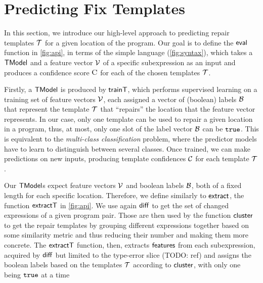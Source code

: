 \section{Predicting Fix Templates}
\label{sec:templ-pred}

In this section, we introduce our high-level approach to predicting repair
templates $\mathcal{T}$ for a given location of the program. Our goal is to define the
$\mathsf{eval}$ function in \autoref{fig:api}, in terms of the simple language
\repairLang (\autoref{fig:syntax}), which takes a $\mathsf{TModel}$ and a feature vector
$\mathcal{V}$ of a specific subexpression as an input and produces a confidence score
$\textsc{C}$ for each of the chosen templates $\mathcal{T}$.

Firstly, a $\mathsf{TModel}$ is produced by $\mathsf{trainT}$, which performs supervised
learning on a training set of feature vectors $\mathcal{V}$, each assigned a vector of
(boolean) labels $\mathcal{B}$ that represent the template $\mathcal{T}$ that ``repairs'' the
location that the feature vector represents. In our case, only one template can
be used to repair a given location in a program, thus, at most, only one slot of
the label vector $\mathcal{B}$ can be $\mathtt{true}$. This is equivalent to the
\emph{multi-class classification} problem, where the predictor models have to
learn to distinguish between several classes. Once trained, we can make
predictions on new inputs, producing template confidences $\mathcal{C}$ for each
template $\mathcal{T}$.

Our $\mathsf{TModel}$s expect feature vectors $\mathcal{V}$ and boolean labels $\mathcal{B}$, both of a
fixed length for each specific location. Therefore, we define similarly to
$\mathsf{extract}$, the function $\mathsf{extractT}$ in \autoref{fig:api}. We use again
$\mathsf{diff}$ to get the set of changed expressions of a given program pair. Those
are then used by the function $\mathsf{cluster}$ to get the repair templates by
grouping different expressions together based on some similarity metric and thus
reducing their number and making them more concrete. The $\mathsf{extractT}$
function, then, extracts $\mathsf{features}$ from each subexpression, acquired by
$\mathsf{diff}$ but limited to the type-error slice (TODO: ref) and assigns the
boolean labels based on the templates $\mathcal{T}$ according to $\mathsf{cluster}$, with only
one being $\mathtt{true}$ at a time




